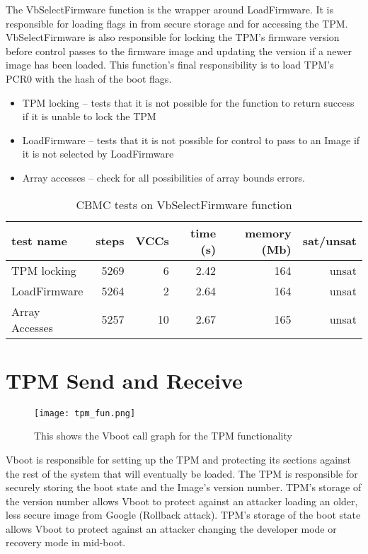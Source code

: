 The VbSelectFirmware function is the wrapper around LoadFirmware.
It is responsible for loading flags in from secure storage and for accessing the TPM\@.
VbSelectFirmware is also responsible for locking the TPM's firmware version before control passes to the firmware image and updating the version if a newer image has been loaded.
This function's final responsibility is to load TPM's PCR0 with the hash of the boot flags.

\begin{itemize}
 \item  TPM locking -- tests that it is not possible for the function to return success if it is unable to lock the TPM
 \item  LoadFirmware -- tests that it is not possible for control to pass to an Image if it is not selected by LoadFirmware
 \item  Array accesses -- check for all possibilities of array bounds errors.
\end{itemize}

\begin{table}[!htbp]
    \centering
    \caption{CBMC tests on VbSelectFirmware function}\label{sfw_results}
    \begin{tabular}{lrrrrr}
        \toprule
        test name & steps & VCCs & time (s) & memory (Mb) & sat/unsat  \\ \midrule
        TPM locking & 5269 & 6 & 2.42 & 164 & unsat \\
        LoadFirmware & 5264 & 2 & 2.64 & 164 & unsat \\
        Array Accesses & 5257 & 10 & 2.67 & 165 &  unsat \\\bottomrule
    \end{tabular}
\end{table}

\section{TPM Send and Receive}

\begin{figure}[!htbp]
  \centering
  \texttt{[image: tpm\_fun.png]}
  \caption[TPM Call Graph]{This shows the Vboot call graph for the TPM functionality}\label{fig:tpm_call_graph}
\end{figure}

Vboot is responsible for setting up the TPM and protecting its
sections against the rest of the system that will eventually be loaded.
The TPM is responsible for securely storing the boot state and the
Image's version number.
TPM's storage of the version number allows Vboot to protect against 
an attacker loading an older, less secure image from Google (Rollback attack).
TPM's storage of the boot state allows Vboot to protect against an attacker 
changing the developer mode or recovery mode in mid-boot.

